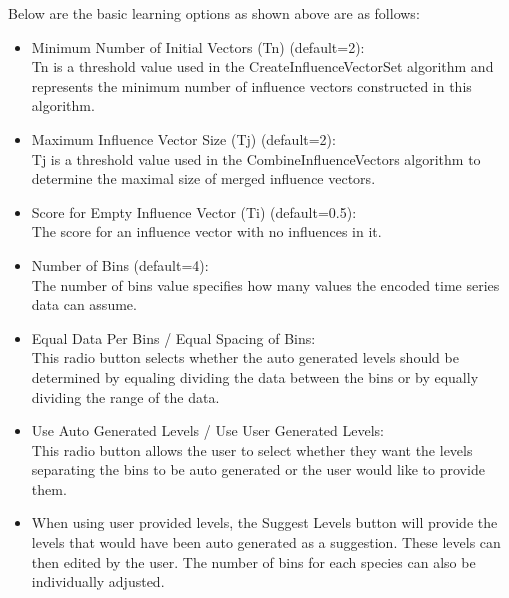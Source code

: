 \documentclass[titlepage,11pt]{article}
\begin{document}
Below are the basic learning options as shown above are as follows:
\begin{itemize}
\item Minimum Number of Initial Vectors (Tn) (default=2): \\
Tn is a threshold value used in the CreateInfluenceVectorSet
algorithm and represents the minimum number of influence vectors
constructed in this algorithm.
\item Maximum Influence Vector Size (Tj) (default=2): \\
Tj is a threshold value used in the CombineInfluenceVectors
algorithm to determine the maximal size of merged influence
vectors.
\item Score for Empty Influence Vector (Ti) (default=0.5): \\
The score for an influence vector with no influences in it.
\item Number of Bins (default=4): \\
The number of bins value specifies how many values the
encoded time series data can assume.
\item Equal Data Per Bins / Equal Spacing of Bins: \\
This radio button selects whether the auto generated levels
should be determined by equaling dividing the data between the
bins or by equally dividing the range of the data. 
\item Use Auto Generated Levels / Use User Generated Levels: \\
This radio button allows the user to select whether they want
the levels separating the bins to be auto generated or the user
would like to provide them. 
\item When using user provided levels, the Suggest Levels
button will provide the levels that would have been auto
generated as a suggestion. These levels can then edited by the
user.  The number of bins for each species can also be individually adjusted.  
\end{itemize}
\end{document}

